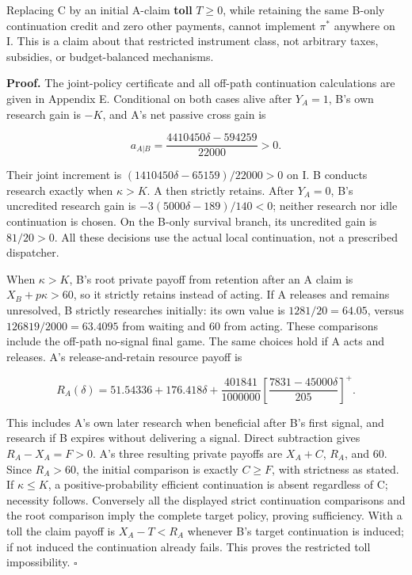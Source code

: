 \documentclass[
  11pt,
]{article}
\begin{document}
Replacing C by an initial A-claim \textbf{toll} \(T\geq0\), while
retaining the same B-only continuation credit and zero other payments,
cannot implement \(\pi^*\) anywhere on I. This is a claim about that
restricted instrument class, not arbitrary taxes, subsidies, or
budget-balanced mechanisms.

\textbf{Proof.} The joint-policy certificate and all off-path
continuation calculations are given in Appendix E. Conditional on both
cases alive after \(Y_A=1\), B's own research gain is \(-K\), and A's
net passive cross gain is

\[a_{A|B}=\frac{4410450\delta-594259}{22000}>0.\]

Their joint increment is \((1410450\delta-65159)/22000>0\) on I. B
conducts research exactly when \(\kappa>K\). A then strictly retains.
After \(Y_A=0\), B's uncredited research gain is
\(-3(5000\delta-189)/140<0\); neither research nor idle continuation is
chosen. On the B-only survival branch, its uncredited gain is
\(81/20>0\). All these decisions use the actual local continuation, not
a prescribed dispatcher.

When \(\kappa>K\), B's root private payoff from retention after an A
claim is \(X_B+p\kappa>60\), so it strictly retains instead of acting.
If A releases and remains unresolved, B strictly researches initially:
its own value is \(1281/20=64.05\), versus \(126819/2000=63.4095\) from
waiting and 60 from acting. These comparisons include the off-path
no-signal final game. The same choices hold if A acts and releases. A's
release-and-retain resource payoff is

\[R_A(\delta)=51.54336+176.418\delta+
\frac{401841}{1000000}\left[\frac{7831-45000\delta}{205}\right]^+ . \tag{18}\]

This includes A's own later research when beneficial after B's first
signal, and research if B expires without delivering a signal. Direct
subtraction gives \(R_A-X_A=F>0\). A's three resulting private payoffs
are \(X_A+C\), \(R_A\), and 60. Since \(R_A>60\), the initial comparison
is exactly \(C\geq F\), with strictness as stated. If \(\kappa\leq K\),
a positive-probability efficient continuation is absent regardless of C;
necessity follows. Conversely all the displayed strict continuation
comparisons and the root comparison imply the complete target policy,
proving sufficiency. With a toll the claim payoff is \(X_A-T<R_A\)
whenever B's target continuation is induced; if not induced the
continuation already fails. This proves the restricted toll
impossibility. \(\square\)
\end{document}
